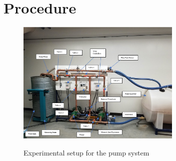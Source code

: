 

\section{Procedure}
\begin{figure}[h]
    \centering
    \includegraphics[width=0.7\textwidth]{Sections/Figures/Experimental Setup.jpg}
    \label{fig:experimental_setup}
    \caption{Experimental setup for the pump system}
\end{figure}
